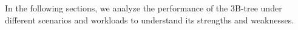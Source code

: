 In the following sections, we analyze the performance of the 3B-tree under different scenarios and workloads to understand its strengths and weaknesses.




